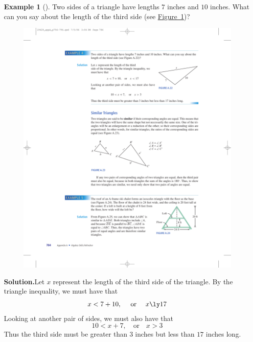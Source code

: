 \documentclass[10pt,]{book}
\theoremstyle{plain}
\theoremstyle{definition}
\theoremstyle{definition}
\newtheorem{example}[theorem]{Example}
\theoremstyle{definition}
\numberwithin{equation}{part}
\newcommand{\lt}{<}
\newcommand{\gt}{>}
\begin{document}
\begin{example}[]\label{example-82}
Two sides of a triangle have lengths \(7\) inches and \(10\) inches. What can you say about the length of the third side (see \hyperref[fig-oblique-triangle2]{Figure~\ref{fig-oblique-triangle2}})? \leavevmode%
\begin{figure}
\centering
\includegraphics[width=0.5\linewidth]{images/fig-oblique-triangle2}
\caption{\label{fig-oblique-triangle2}}
\end{figure}
%
\par\medskip\noindent%
\textbf{Solution.}\quad Let \(x\) represent the length of the third side of the triangle. By the triangle inequality, we must have that%
\begin{equation*}
x \lt 7 + 10, ~~~\text{ or }~~~ x \ly 17
\end{equation*}
Looking at another pair of sides, we must also have that%
\begin{equation*}
10 \lt x + 7, ~~~\text{ or }~~~  x \gt 3
\end{equation*}
Thus the third side must be greater than \(3\) inches but less than \(17\) inches long.%
\end{example}
\typeout{************************************************}
\typeout{************************************************}
\end{document}
